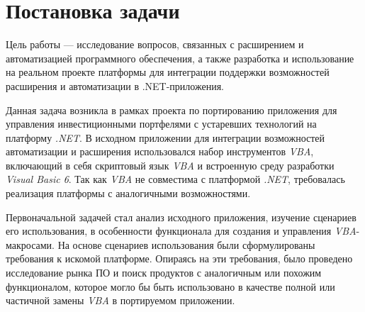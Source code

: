 \section{Постановка задачи}
\label{sec:problem_statement}

Цель работы --- исследование вопросов, связанных с расширением и автоматизацией программного обеспечения, а также разработка и использование на реальном проекте платформы для интеграции поддержки возможностей расширения и автоматизации в .NET-приложения.

Данная задача возникла в рамках проекта по портированию приложения для управления инвестиционными портфелями с устаревших технологий на платформу {\it .NET}. В исходном приложении для интеграции возможностей автоматизации и расширения использовался набор инструментов {\it VBA}, включающий в себя скриптовый язык {\it VBA} и встроенную среду разработки {\it Visual Basic 6}. Так как {\it VBA} не совместима с платформой {\it .NET}, требовалась реализация платформы с аналогичными возможностями. 

Первоначальной задачей стал анализ исходного приложения, изучение сценариев его использования, в особенности функционала для создания и управления {\it VBA}-макросами. На основе сценариев использования были сформулированы требования к искомой платформе. Опираясь на эти требования, было проведено исследование рынка ПО и поиск продуктов с аналогичным или похожим функционалом, которое могло бы быть использовано в качестве полной или частичной замены {\it VBA} в портируемом приложении.

\pagebreak